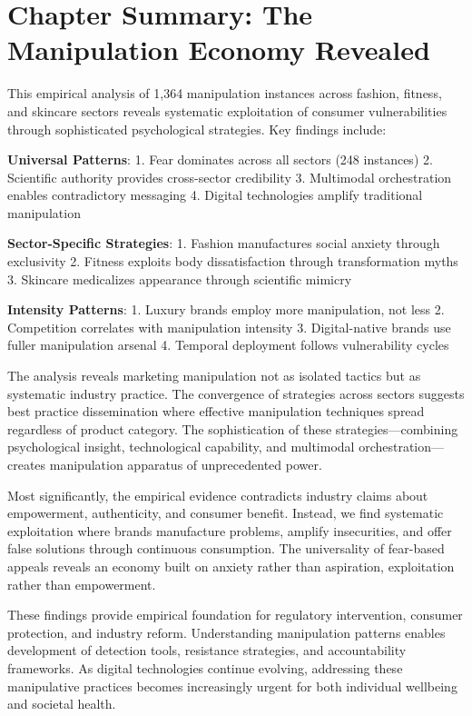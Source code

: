 \section{Chapter Summary: The Manipulation Economy Revealed}
\label{sec:empirical_summary}

This empirical analysis of 1,364 manipulation instances across fashion, fitness, and skincare sectors reveals systematic exploitation of consumer vulnerabilities through sophisticated psychological strategies. Key findings include:

\textbf{Universal Patterns}:
1. Fear dominates across all sectors (248 instances)
2. Scientific authority provides cross-sector credibility
3. Multimodal orchestration enables contradictory messaging
4. Digital technologies amplify traditional manipulation

\textbf{Sector-Specific Strategies}:
1. Fashion manufactures social anxiety through exclusivity
2. Fitness exploits body dissatisfaction through transformation myths
3. Skincare medicalizes appearance through scientific mimicry

\textbf{Intensity Patterns}:
1. Luxury brands employ more manipulation, not less
2. Competition correlates with manipulation intensity
3. Digital-native brands use fuller manipulation arsenal
4. Temporal deployment follows vulnerability cycles

The analysis reveals marketing manipulation not as isolated tactics but as systematic industry practice. The convergence of strategies across sectors suggests best practice dissemination where effective manipulation techniques spread regardless of product category. The sophistication of these strategies—combining psychological insight, technological capability, and multimodal orchestration—creates manipulation apparatus of unprecedented power.

Most significantly, the empirical evidence contradicts industry claims about empowerment, authenticity, and consumer benefit. Instead, we find systematic exploitation where brands manufacture problems, amplify insecurities, and offer false solutions through continuous consumption. The universality of fear-based appeals reveals an economy built on anxiety rather than aspiration, exploitation rather than empowerment.

These findings provide empirical foundation for regulatory intervention, consumer protection, and industry reform. Understanding manipulation patterns enables development of detection tools, resistance strategies, and accountability frameworks. As digital technologies continue evolving, addressing these manipulative practices becomes increasingly urgent for both individual wellbeing and societal health.
